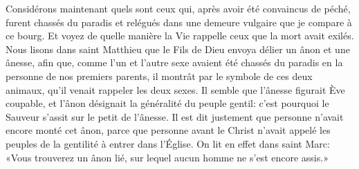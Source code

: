 Considérons maintenant quels sont ceux
	qui, après avoir été convaincus de péché, furent chassés du paradis
	et relégués dans une demeure vulgaire que je compare à ce bourg.
Et voyez de quelle manière la Vie rappelle ceux que la mort avait exilés.
Nous lisons dans saint Matthieu
	que le Fils de Dieu envoya délier un ânon et une ânesse,
	afin que, comme l’un et l’autre sexe
		avaient été chassés du paradis en la personne de nos premiers parents,
	il montrât par le symbole de ces deux animaux,
		qu’il venait rappeler les deux sexes.
Il semble que l’ânesse figurait Ève coupable,
	et l’ânon désignait la généralité du peuple gentil:
	c’est pourquoi le Sauveur s’assit sur le petit de l’ânesse.
Il est dit justement que personne n’avait encore monté cet ânon,
	parce que personne avant le Christ
		n’avait appelé les peuples de la gentilité à entrer dans l’Église.
On lit en effet dans saint Marc:
	«Vous trouverez un ânon lié, sur lequel aucun homme ne s’est encore assis.»
